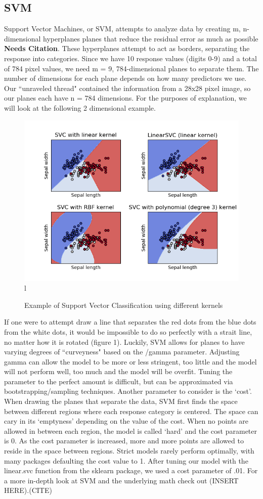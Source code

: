 \documentclass[11pt, oneside]{article}   	%
\begin{document}
\subsection{SVM}
Support Vector Machines, or SVM, attempts to analyze data by creating m, n-dimensional hyperplanes planes that reduce the residual error as much as possible \textbf{Needs Citation}. These hyperplanes attempt to act as borders, separating the response into categories. Since we have 10 response values (digits 0-9) and a total of 784 pixel values, we need m = 9, 784-dimensional planes to separate them. The number of dimensions for each plane depends on how many predictors we use. Our ``unraveled thread" contained the information from a 28x28 pixel image, so our planes each have n = 784 dimensions. For the purposes of explanation, we will look at the following 2 dimensional example.
\begin{figure}
\caption{Example of Support Vector Classification using different kernels}
\includegraphics[width=\textwidth]{Figure_1.png}l
\end{figure}
If one were to attempt draw a line that separates the red dots from the blue dots from the white dots, it would be impossible to do so perfectly with a strait line, no matter how it is rotated (figure 1). Luckily, SVM allows for planes to have varying degrees of ``curveyness" based on the /gamma parameter. Adjusting gamma can allow the model to be more or less stringent, too little and the model will not perform well, too much and the model will be overfit. Tuning the parameter to the perfect amount is difficult, but can be approximated via bootstrapping/sampling techniques. Another parameter to consider is the `cost'. When drawing the planes that separate the data, SVM first finds the space between different regions where each response category is centered. The space can cary in its `emptyness' depending on the value of the cost. When no points are allowed in between each region, the model is called `hard' and the cost parameter is 0. As the cost parameter is increased, more and more points are allowed to reside in the space between regions. Strict models rarely perform optimally, with many packages defaulting the cost value to 1. After tuning our model with the linear.svc function from the sklearn package, we used a cost parameter of .01. For a more in-depth look at SVM and the underlying math check out (INSERT HERE).(CITE)
\end{document}

